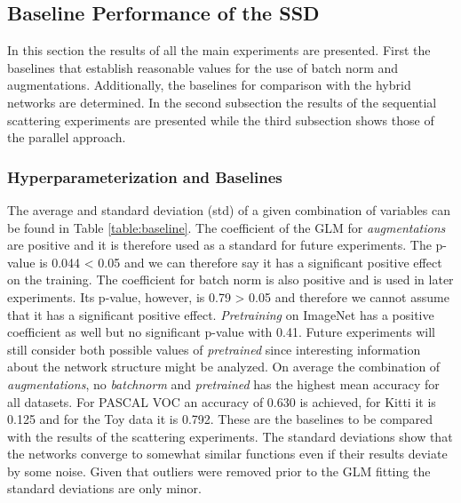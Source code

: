 \subsection{Baseline Performance of the SSD}
\label{subsec:baseline_SSD_results}

In this section the results of all the main experiments are presented. First the baselines that establish reasonable values for the use of batch norm and augmentations. Additionally, the baselines for comparison with the hybrid networks are determined. In the second subsection the results of the sequential scattering experiments are presented while the third subsection shows those of the parallel approach.

\subsubsection{Hyperparameterization and Baselines}

The average and standard deviation (std) of a given combination of variables can be found in Table \ref{table:baseline}. The coefficient of the GLM for \textit{augmentations} are positive and it is therefore used as a standard for future experiments. The p-value is 0.044 < 0.05 and we can therefore say it has a significant positive effect on the training. The coefficient for batch norm is also positive and is used in later experiments. Its p-value, however, is 0.79 > 0.05 and therefore we cannot assume that it has a significant positive effect. \textit{Pretraining} on ImageNet has a positive coefficient as well but no significant p-value with 0.41. Future experiments will still consider both possible values of \textit{pretrained} since interesting information about the network structure might be analyzed. On average the combination of \textit{augmentations}, no \textit{batchnorm} and \textit{pretrained} has the highest mean accuracy for all datasets. For PASCAL VOC an accuracy of 0.630 is achieved, for Kitti it is 0.125 and for the Toy data it is 0.792. These are the baselines to be compared with the results of the scattering experiments. The standard deviations show that the networks converge to somewhat similar functions even if their results deviate by some noise. Given that outliers were removed prior to the GLM fitting the standard deviations are only minor. 

